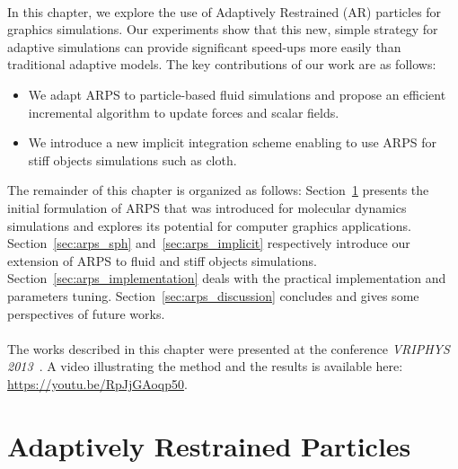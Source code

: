 \paragraph*{}
In this chapter, we explore the use of Adaptively Restrained (AR) particles for graphics simulations. Our experiments show that this new, simple strategy for adaptive simulations can provide significant speed-ups more easily than traditional adaptive models. The key contributions of our work are as follows: 
\begin{itemize}
\item We adapt ARPS to particle-based fluid simulations and propose an efficient incremental algorithm to update forces and scalar fields.
\item We introduce a new implicit integration scheme enabling to use ARPS for stiff objects simulations such as cloth.
\end{itemize}

The remainder of this chapter is organized as follows: 
Section~\ref{sec:arps_basics} presents the initial formulation of ARPS that was introduced for molecular dynamics simulations and explores its potential for computer graphics applications. 
Section~\ref{sec:arps_sph} and~\ref{sec:arps_implicit} respectively introduce our extension of ARPS to fluid and stiff objects simulations. 
Section~\ref{sec:arps_implementation} deals with the practical implementation and parameters tuning. 
Section~\ref{sec:arps_discussion} concludes and gives some perspectives of future works.
\paragraph*{}
The works described in this chapter were presented at the conference \emph{VRIPHYS 2013}~\cite{Manteaux2013}. 
A video illustrating the method and the results is available here: \url{https://youtu.be/RpJjGAoqp50}.
\section{Adaptively Restrained Particles} 
\label{sec:arps_basics}
